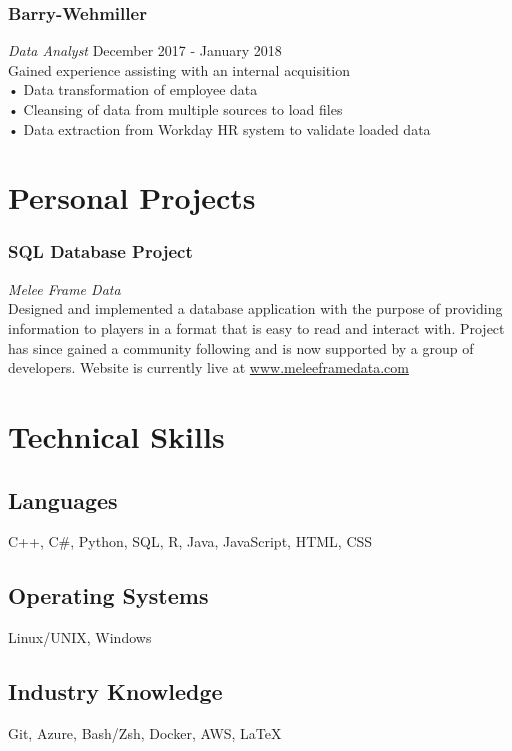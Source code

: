 \documentclass[11pt]{article}
\begin{document}
\subsubsection{Barry-Wehmiller}
\hspace{.2in} \textit{Data Analyst} \hspace*{\fill} December 2017 - January 2018 \\
Gained experience assisting with an internal acquisition \\
• Data transformation of employee data \\
• Cleansing of data from multiple sources to load files \\
• Data extraction from Workday HR system to validate loaded data 


\section{Personal Projects}

\subsubsection{SQL Database Project} 
\hspace{.2in} \textit{Melee Frame Data} \\
Designed and implemented a database application with the purpose of providing information
to players in a format that is easy to read and interact with. Project has since gained a community following and is now supported by a group of developers. Website is currently live at \url{www.meleeframedata.com}


\section{Technical Skills}

\subsection{Languages}
C++, C\#, Python, SQL, R, Java, JavaScript, HTML, CSS

\subsection{Operating Systems}
Linux/UNIX, Windows

\subsection{Industry Knowledge}
Git, Azure, Bash/Zsh, Docker, AWS, {\LaTeX}
\end{document}

